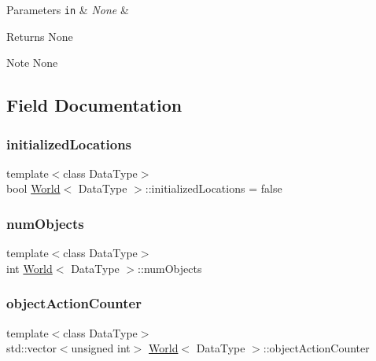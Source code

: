 \begin{DoxyParams}[1]{Parameters}
\mbox{\tt in}  & {\em None} & \\
\hline
\end{DoxyParams}
\begin{DoxyReturn}{Returns}
None
\end{DoxyReturn}
\begin{DoxyNote}{Note}
None 
\end{DoxyNote}


\subsection{Field Documentation}
\hypertarget{class_world_a6f29951c9b3aa2135da80fc0247e3b51}{}\label{class_world_a6f29951c9b3aa2135da80fc0247e3b51} 
\subsubsection{\texorpdfstring{initialized\+Locations}{initializedLocations}}
{\footnotesize\ttfamily template$<$class Data\+Type$>$ \\
bool \hyperlink{class_world}{World}$<$ Data\+Type $>$\+::initialized\+Locations = false\hspace{0.3cm}{\ttfamily [private]}}

\hypertarget{class_world_a1fe4efb713f70d780c03481db59e403f}{}\label{class_world_a1fe4efb713f70d780c03481db59e403f} 
\subsubsection{\texorpdfstring{num\+Objects}{numObjects}}
{\footnotesize\ttfamily template$<$class Data\+Type$>$ \\
int \hyperlink{class_world}{World}$<$ Data\+Type $>$\+::num\+Objects\hspace{0.3cm}{\ttfamily [private]}}

\hypertarget{class_world_a8571b88a01f16816faa26bd31bcf465d}{}\label{class_world_a8571b88a01f16816faa26bd31bcf465d} 
\subsubsection{\texorpdfstring{object\+Action\+Counter}{objectActionCounter}}
{\footnotesize\ttfamily template$<$class Data\+Type$>$ \\
std\+::vector$<$unsigned int$>$ \hyperlink{class_world}{World}$<$ Data\+Type $>$\+::object\+Action\+Counter\hspace{0.3cm}{\ttfamily [private]}}

